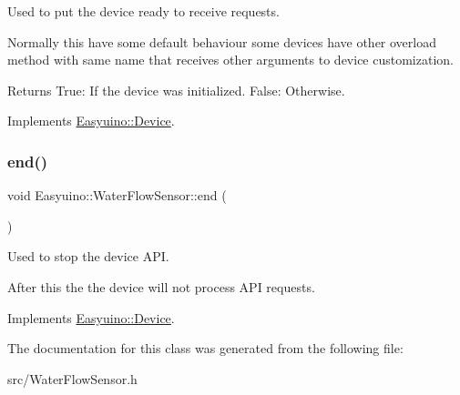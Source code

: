 Used to put the device ready to receive requests. 

Normally this have some default behaviour some devices have other overload method with same name that receives other arguments to device customization. \begin{DoxyReturn}{Returns}
True\+: If the device was initialized. False\+: Otherwise. 
\end{DoxyReturn}


Implements \hyperlink{class_easyuino_1_1_device_a2e7bb2fec849719a9d9432b57cdb72ba}{Easyuino\+::\+Device}.

\mbox{\label{class_easyuino_1_1_water_flow_sensor_a7f31ac7735b049394d34cfbc37f17359}} 
\subsubsection{\texorpdfstring{end()}{end()}}
{\footnotesize\ttfamily void Easyuino\+::\+Water\+Flow\+Sensor\+::end (\begin{DoxyParamCaption}{ }\end{DoxyParamCaption})\hspace{0.3cm}{\ttfamily [virtual]}}



Used to stop the device A\+PI. 

After this the the device will not process A\+PI requests. 

Implements \hyperlink{class_easyuino_1_1_device_ab31018ef64adc84aa2ea575b2297548f}{Easyuino\+::\+Device}.



The documentation for this class was generated from the following file\+:\begin{DoxyCompactItemize}
\item 
src/Water\+Flow\+Sensor.\+h\end{DoxyCompactItemize}
